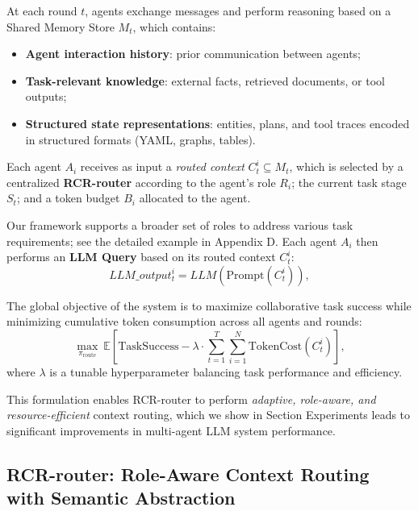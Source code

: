 \documentclass[letterpaper]{article} %
\begin{document}
At each round $t$, agents exchange messages and perform reasoning based on a Shared Memory Store $M_t$, which contains:
\begin{itemize}
    \item \textbf{Agent interaction history}: prior communication between agents;
    \item \textbf{Task-relevant knowledge}: external facts, retrieved documents, or tool outputs;
    \item \textbf{Structured state representations}: entities, plans, and tool traces encoded in structured formats (YAML, graphs, tables).
\end{itemize}

Each agent $A_i$ receives as input a \textit{routed context} $C_t^i \subseteq M_t$, which is selected by a centralized \textbf{RCR-router} according to the agent’s role $R_i$; the current task stage $S_t$;
and a token budget $B_i$ allocated to the agent.

Our framework supports a broader set of roles to address various task requirements; see the detailed example in Appendix D. %
Each agent $A_i$ then performs an \textbf{LLM Query} based on its routed context $C_t^i$:
\begin{equation}
LLM\_output^i_t = LLM( \text{Prompt}(C_t^i) ),
\end{equation}

The global objective of the system is to maximize collaborative task success while minimizing cumulative token consumption across all agents and rounds:
\begin{equation}
\max_{\pi_{\text{route}}} \ \mathbb{E} \left[ \text{TaskSuccess} - \lambda \cdot \sum_{t=1}^{T} \sum_{i=1}^{N} \text{TokenCost}(C_t^i) \right],
\end{equation}
where $\lambda$ is a tunable hyperparameter balancing task performance and efficiency.

This formulation enables RCR-router to perform \textit{adaptive, role-aware, and resource-efficient} context routing, which we show in Section Experiments  %
leads to significant improvements in multi-agent LLM system performance.



\subsection{RCR-router: Role-Aware Context Routing with Semantic Abstraction}
\end{document}
